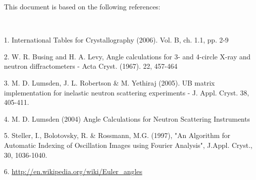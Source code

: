 \documentclass[prb]{revtex4}%
\begin{document}
This document is based on the following references:

\


1. International Tables for Crystallography (2006). Vol. B, ch. 1.1, pp. 2-9

2. W. R. Busing and H. A. Levy, Angle calculations for 3- and 4-circle X-ray and neutron diffractometers - Acta Cryst. (1967). 22, 457-464

3. 	M. D. Lumsden, J. L. Robertson \& M. Yethiraj (2005). UB matrix implementation for inelastic neutron scattering experiments - J. Appl. Cryst. 38, 405-411.

4. M. D. Lumsden (2004) Angle Calculations for Neutron Scattering Instruments

5. Steller, I., Bolotovsky, R. \& Rossmann, M.G. (1997), "An Algorithm for Automatic Indexing of Oscillation Images using Fourier Analysis", J.Appl. Cryst., 30, 1036-1040.

6. \href{http://en.wikipedia.org/wiki/Euler_angles}{http://en.wikipedia.org/wiki/Euler\_angles}
\end{document}
